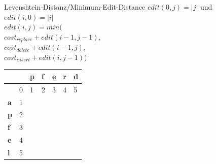 \documentclass[aspectratio=169]{beamer}
\begin{document}
\begin{frame}[fragile]{Levenshtein-Distanz/Minimum-Edit-Distance}
$edit(0,j)=|j|$ und $edit(i,0)=|i|$\\
$edit(i,j)=min($\\
$cost_{replace} + edit(i-1,j-1),  $\\
$cost_{delete}+ edit(i-1,j),$\\
$cost_{insert}+ edit(i,j-1))  $\\
\begin{table}[]
\begin{tabular}{|l|l|l|l|l|l|l|}
\hline
           & \textbf{} & \textbf{p} & \textbf{f} & \textbf{e} & \textbf{r} & \textbf{d} \\ \hline
\textbf{}  & 0         & 1          & 2          & 3          & 4          & 5          \\ \hline
\textbf{a} & 1         &            &            &            &            &            \\ \hline
\textbf{p} & 2         &            &            &            &            &            \\ \hline
\textbf{f} & 3         &            &            &            &            &            \\ \hline
\textbf{e} & 4         &            &            &            &            &            \\ \hline
\textbf{l} & 5         &            &            &            &            &            \\ \hline
\end{tabular}
\end{table}
\end{frame}
\end{document}
